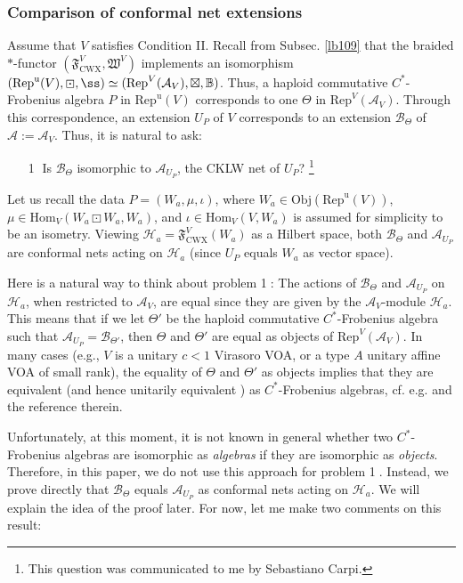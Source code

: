 \documentclass[11pt,b5paper,notitlepage]{article}
\theoremstyle{definition}
\theoremstyle{plain}
\newcommand{\fk}{\mathfrak}
\newcommand{\mc}{\mathcal}
\newcommand{\Hom}{\mathrm{Hom}}
\newcommand{\Rep}{\mathrm{Rep}}
\newcommand{\uni}{\mathrm{u}}
\newcommand{\RepV}{{\mathrm{Rep}^\uni(V)}}
\newcommand{\Obj}{\mathrm{Obj}}
\newcommand{\CWX}{{\scriptscriptstyle \mathrm{CWX}}}
\numberwithin{equation}{section}
\begin{document}
\subsubsection{Comparison of conformal net extensions}

Assume that $V$ satisfies Condition II. Recall from Subsec. \ref{lb109} that the braided $*$-functor $(\fk F^V_\CWX,\fk W^V)$ implements an isomorphism $(\RepV,\boxdot,\ss)\simeq(\Rep^V(\mc A_V),\boxtimes,\mathbb B)$. Thus, a haploid commutative $C^*$-Frobenius algebra $P$ in $\RepV$ corresponds to one $\Theta$ in $\Rep^V(\mc A_V)$. Through this correspondence, an extension $U_P$ of $V$ corresponds to an extension $\mc B_\Theta$ of $\mc A:=\mc A_V$. Thus, it is natural to ask:
\begin{itemize}
\item[\large\textcircled{\small 1}] Is $\mc B_\Theta$ isomorphic to $\mc A_{U_P}$, the CKLW net of $U_P$? \footnote{This question was communicated to me by Sebastiano Carpi.}
\end{itemize}

Let us recall the data $P=(W_a,\mu,\iota)$, where $W_a\in\Obj(\RepV)$, $\mu\in\Hom_V(W_a\boxdot W_a,W_a)$, and $\iota\in\Hom_V(V,W_a)$ is assumed for simplicity to be an isometry. Viewing $\mc H_a=\fk F^V_\CWX(W_a)$ as a Hilbert space, both $\mc B_\Theta$ and $\mc A_{U_P}$ are conformal nets acting on $\mc H_a$ (since $U_P$ equals $W_a$ as vector space).


Here is a natural way to think about problem \textcircled{\small 1}: The actions of $\mc B_\Theta$ and $\mc A_{U_P}$ on $\mc H_a$, when restricted to $\mc A_V$, are equal since they are given by the $\mc A_V$-module $\mc H_a$. This means that if we let $\Theta'$ be the haploid commutative $C^*$-Frobenius algebra such that $\mc A_{U_P}=\mc B_{\Theta'}$, then $\Theta$ and $\Theta'$ are equal as objects of $\Rep^V(\mc A_V)$. In many cases (e.g., $V$ is a unitary $c<1$ Virasoro VOA, or a type $A$ unitary affine VOA of small rank), the equality of $\Theta$ and $\Theta'$ as objects implies that they are equivalent (and hence unitarily equivalent \cite{CGGH23}) as $C^*$-Frobenius algebras, cf. e.g. \cite{Gan23} and the reference therein. 

Unfortunately, at this moment, it is not known in general whether two $C^*$-Frobenius algebras are isomorphic as \textit{algebras} if they are isomorphic as \textit{objects}. Therefore, in this paper, we do not use this approach for problem \textcircled{\small 1}. Instead, we prove directly that $\mc B_\Theta$ equals $\mc A_{U_P}$ as conformal nets acting on $\mc H_a$. We will explain the idea of the proof later. For now, let me make two comments on this result: 
\end{document}
